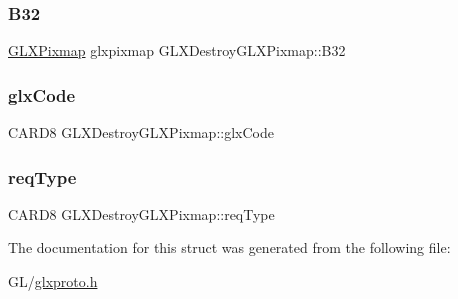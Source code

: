 \subsubsection{\texorpdfstring{B32}{B32}}
{\footnotesize\ttfamily \hyperlink{glx_8h_a6577d581069de43ebaac50c78dbccbd0}{G\+L\+X\+Pixmap} glxpixmap G\+L\+X\+Destroy\+G\+L\+X\+Pixmap\+::\+B32}

\mbox{\label{struct_g_l_x_destroy_g_l_x_pixmap_a433a8641bb3d06d475b8bcfbd125e212}} 
\subsubsection{\texorpdfstring{glx\+Code}{glxCode}}
{\footnotesize\ttfamily C\+A\+R\+D8 G\+L\+X\+Destroy\+G\+L\+X\+Pixmap\+::glx\+Code}

\mbox{\label{struct_g_l_x_destroy_g_l_x_pixmap_a4e094a03cd022e3aa57fe41b81727903}} 
\subsubsection{\texorpdfstring{req\+Type}{reqType}}
{\footnotesize\ttfamily C\+A\+R\+D8 G\+L\+X\+Destroy\+G\+L\+X\+Pixmap\+::req\+Type}



The documentation for this struct was generated from the following file\+:\begin{DoxyCompactItemize}
\item 
G\+L/\hyperlink{glxproto_8h}{glxproto.\+h}\end{DoxyCompactItemize}
